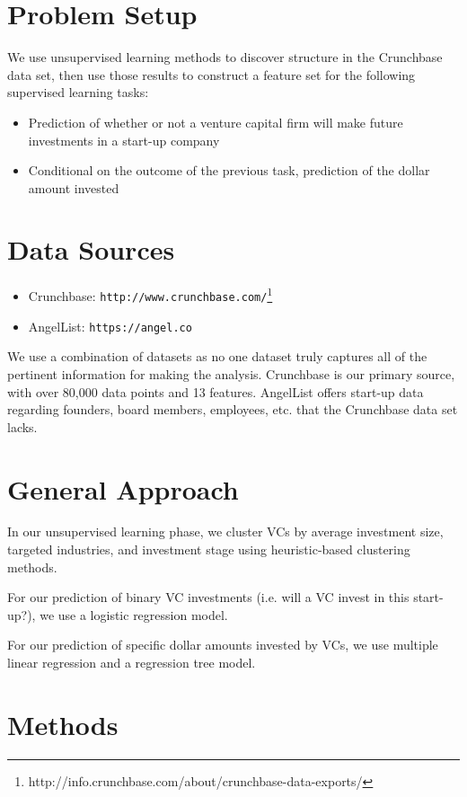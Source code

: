 \documentclass{article}
\begin{document}
\section{Problem Setup}
We use unsupervised learning methods to discover structure in the Crunchbase data set, then use those results to construct a feature set for the following supervised learning tasks:

\begin{itemize}
\item{Prediction of whether or not a venture capital firm will make future investments in a start-up company}
\item{Conditional on the outcome of the previous task, prediction of the dollar amount invested}
\end{itemize}

\section{Data Sources}

\begin{itemize}
\item{Crunchbase: \verb+http://www.crunchbase.com/+\footnote{http://info.crunchbase.com/about/crunchbase-data-exports/}}
\item{AngelList: \verb+https://angel.co+\\}
\end{itemize}
We use a combination of datasets as no one dataset truly captures all of the pertinent information for making the analysis. Crunchbase is our primary source, with over 80,000 data points and 13 features. AngelList offers start-up data regarding founders, board members, employees, etc. that the Crunchbase data set lacks.

\section{General Approach}
In our unsupervised learning phase, we cluster VCs by average investment size, targeted industries, and investment stage using heuristic-based clustering methods.

For our prediction of binary VC investments (i.e. will a VC invest in this start-up?), we use a logistic regression model. 

For our prediction of specific dollar amounts invested by VCs, we use multiple linear regression and a regression tree model. 

\section{Methods}
\end{document}
